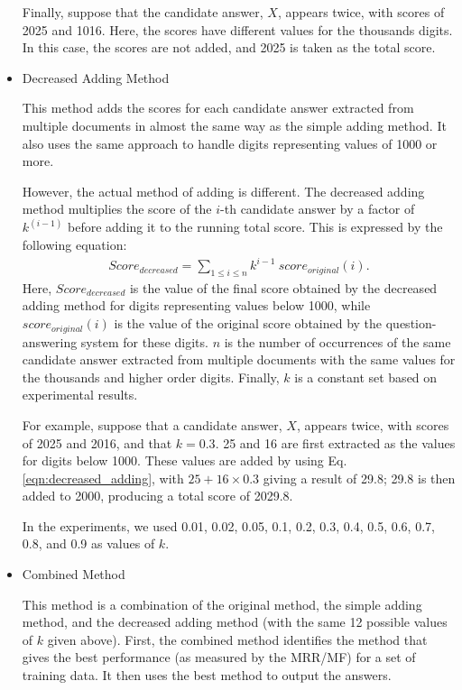 \begin{itemize}
  Finally, suppose that the candidate answer, $X$, appears twice, 
  with scores of 2025 and 1016. Here, the scores have 
  different values for the thousands digits. In this case, the scores are not added, 
  and 2025 is taken as the total score. 

\item   
  Decreased Adding Method

  This method adds the scores for each candidate answer
  extracted from multiple documents
  in almost the same way as the simple adding method.  
  It also uses the same approach to handle
  digits representing values of 1000 or more.  

  However, the actual method of adding is different. 
  The decreased adding method multiplies the score of the $i$-th candidate answer by a factor of $k^{(i-1)}$ 
  before adding it to the running total score. 
  This is expressed by the following equation:
  \begin{eqnarray}
    \label{eqn:decreased_adding}  
    Score_{decreased} = \displaystyle \sum_{1 \leq i \leq n} k^{i-1} \ score_{original}(i).
  \end{eqnarray}
  Here, $Score_{decreased}$ is the value of 
  the final score obtained by the decreased adding method 
  for digits representing values below 1000, while
  $score_{original}(i)$ is the value of the original score obtained by the question-answering system 
  for these digits. 
  $n$ is the number of occurrences of the same candidate answer extracted 
  from multiple documents with the same values 
  for the thousands and higher order digits. 
  Finally, $k$ is a constant set based on experimental results. 

  For example, suppose that a candidate answer, $X$, appears twice, 
  with scores of 2025 and 2016, and that $k = 0.3$. 25 and 16 are first extracted 
  as the values for digits below 1000. 
  These values are added by using Eq. \ref{eqn:decreased_adding},
  with $25 + 16 \times 0.3$ giving a result of 29.8; 
  29.8 is then added to 2000, producing a total score of 2029.8. 

  In the experiments, we used 0.01, 0.02, 0.05, 0.1, 0.2, 0.3, 0.4, 0.5, 0.6, 0.7, 0.8, and 0.9 as values of $k$. 

\item   
  Combined Method

  This method is a combination of 
  the original method, the simple adding method, and the decreased adding method
  (with the same 12 possible values of $k$ given above).
  First, the combined method identifies 
  the method that gives the best performance (as measured by the MRR/MF)
  for a set of training data. 
  It then uses the best method to output the answers. 


\end{itemize}
